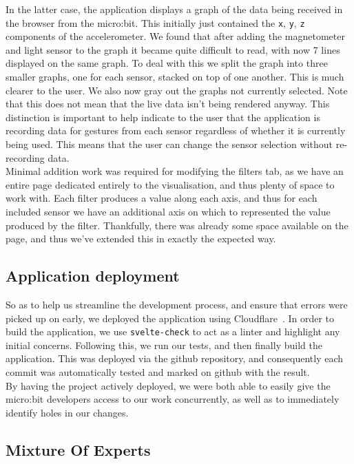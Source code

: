 \documentclass{article}
\begin{document}
In the latter case, the application displays a graph of the data being received in the browser from the micro:bit. This initially just contained the \verb|x|, \verb|y|, \verb|z| components of the accelerometer. We found that after adding the magnetometer and light sensor to the graph it became quite difficult to read, with now 7 lines displayed on the same graph. To deal with this we split the graph into three smaller graphs, one for each sensor, stacked on top of one another. This is much clearer to the user. We also now gray out the graphs not currently selected. Note that this does not mean that the live data isn't being rendered anyway. This distinction is important to help indicate to the user that the application is recording data for gestures from each sensor regardless of whether it is currently being used. This means that the user can change the sensor selection without re-recording data. \\

Minimal addition work was required for modifying the filters tab, as we have an entire page dedicated entirely to the visualisation, and thus plenty of space to work with. Each filter produces a value along each axis, and thus for each included sensor we have an additional axis on which to represented the value produced by the filter. Thankfully, there was already some space available on the page, and thus we've extended this in exactly the expected way.

\subsection{Application deployment}%
\label{subsec:deployment}

So as to help us streamline the development process, and ensure that errors were picked up on early, we deployed the application using Cloudflare~\cite{cloudflare}. In order to build the application, we use \verb|svelte-check| to act as a linter and highlight any initial concerns. Following this, we run our tests, and then finally build the application. This was deployed via the github repository, and consequently each commit was automatically tested and marked on github with the result. \\

By having the project actively deployed, we were both able to easily give the micro:bit developers access to our work concurrently, as well as to immediately identify holes in our changes.

\subsection{Mixture Of Experts}
\end{document}
